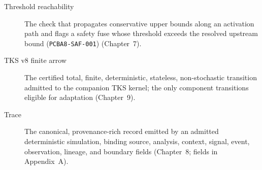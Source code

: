 \begin{description}
\item[Threshold reachability] The check that propagates conservative upper bounds
along an activation path and flags a safety fuse whose threshold exceeds the
resolved upstream bound (\texttt{PCBA8-SAF-001}) (Chapter~7).

\item[TKS v8 finite arrow] The certified total, finite, deterministic, stateless,
non-stochastic transition admitted to the companion TKS kernel; the only
component transitions eligible for adaptation (Chapter~9).

\item[Trace] The canonical, provenance-rich record emitted by an admitted
deterministic simulation, binding source, analysis, context, signal, event,
observation, lineage, and boundary fields (Chapter~8; fields in Appendix~A).

\end{description}
